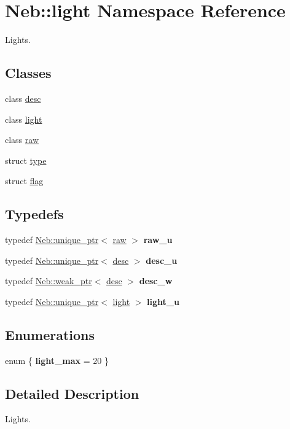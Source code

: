\hypertarget{namespaceNeb_1_1light}{\section{\-Neb\-:\-:light \-Namespace \-Reference}
\label{namespaceNeb_1_1light}
}


\-Lights.  


\subsection*{\-Classes}
\begin{DoxyCompactItemize}
\item 
class \hyperlink{classNeb_1_1light_1_1desc}{desc}
\item 
class \hyperlink{classNeb_1_1light_1_1light}{light}
\item 
class \hyperlink{classNeb_1_1light_1_1raw}{raw}
\item 
struct \hyperlink{structNeb_1_1light_1_1type}{type}
\item 
struct \hyperlink{structNeb_1_1light_1_1flag}{flag}
\end{DoxyCompactItemize}
\subsection*{\-Typedefs}
\begin{DoxyCompactItemize}
\item 
\hypertarget{namespaceNeb_1_1light_a05ce5347f953dde605ebae143df94885}{typedef \hyperlink{classNeb_1_1unique__ptr}{\-Neb\-::unique\-\_\-ptr}$<$ \hyperlink{classNeb_1_1light_1_1raw}{raw} $>$ {\bfseries raw\-\_\-u}}\label{namespaceNeb_1_1light_a05ce5347f953dde605ebae143df94885}

\item 
\hypertarget{namespaceNeb_1_1light_adbbeda86f286b51b1267c4c6cc519b1a}{typedef \hyperlink{classNeb_1_1unique__ptr}{\-Neb\-::unique\-\_\-ptr}$<$ \hyperlink{classNeb_1_1light_1_1desc}{desc} $>$ {\bfseries desc\-\_\-u}}\label{namespaceNeb_1_1light_adbbeda86f286b51b1267c4c6cc519b1a}

\item 
\hypertarget{namespaceNeb_1_1light_a6e582f3de614bc17c9184483a3e68bf0}{typedef \hyperlink{classNeb_1_1weak__ptr}{\-Neb\-::weak\-\_\-ptr}$<$ \hyperlink{classNeb_1_1light_1_1desc}{desc} $>$ {\bfseries desc\-\_\-w}}\label{namespaceNeb_1_1light_a6e582f3de614bc17c9184483a3e68bf0}

\item 
\hypertarget{namespaceNeb_1_1light_a3dfd356d808063e9bc887fa0c22a0b5a}{typedef \hyperlink{classNeb_1_1unique__ptr}{\-Neb\-::unique\-\_\-ptr}$<$ \hyperlink{classNeb_1_1light_1_1light}{light} $>$ {\bfseries light\-\_\-u}}\label{namespaceNeb_1_1light_a3dfd356d808063e9bc887fa0c22a0b5a}

\end{DoxyCompactItemize}
\subsection*{\-Enumerations}
\begin{DoxyCompactItemize}
\item 
enum \{ {\bfseries light\-\_\-max} =  20
 \}
\end{DoxyCompactItemize}


\subsection{\-Detailed \-Description}
\-Lights. 